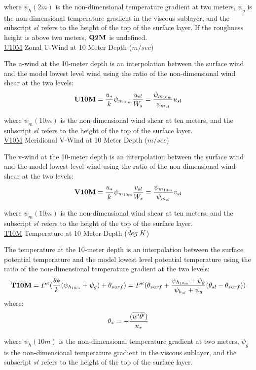\noindent
where $\psi_h(2m)$ is the non-dimensional temperature gradient at two meters, $\psi_g$ is
the non-dimensional temperature gradient in the viscous sublayer, and the subscript
$sl$ refers to the height of the top of the surface layer. If the roughness height
is above two meters, ${\bf Q2M}$ is undefined.
\\
 
\noindent
{ \underline {U10M}  Zonal U-Wind at 10 Meter Depth ($m/sec$) }

\noindent
The u-wind at the 10-meter depth is an interpolation between the surface wind
and the model lowest level wind using the ratio of the non-dimensional wind shear
at the two levels:
\[
{\bf U10M} = {u_* \over k} \psi_{m_{10m}} {u_{sl} \over {W_s}} =
{ \psi_{m_{10m}} \over {\psi_{m_{sl}} }}u_{sl}
\]

\noindent
where $\psi_m(10m)$ is the non-dimensional wind shear at ten meters, and the subscript
$sl$ refers to the height of the top of the surface layer.
\\
 
\noindent
{ \underline {V10M}  Meridional V-Wind at 10 Meter Depth ($m/sec$) }

\noindent
The v-wind at the 10-meter depth is an interpolation between the surface wind
and the model lowest level wind using the ratio of the non-dimensional wind shear
at the two levels:
\[
{\bf V10M} = {u_* \over k} \psi_{m_{10m}} {v_{sl} \over {W_s}} =
{ \psi_{m_{10m}} \over {\psi_{m_{sl}} }}v_{sl}
\]

\noindent
where $\psi_m(10m)$ is the non-dimensional wind shear at ten meters, and the subscript
$sl$ refers to the height of the top of the surface layer.
\\
 
\noindent
{ \underline {T10M}  Temperature at 10 Meter Depth ($deg \hspace{.1cm} K$) }

\noindent
The temperature at the 10-meter depth is an interpolation between the surface potential 
temperature and the model lowest level potential temperature using the ratio of the 
non-dimensional temperature gradient at the two levels:
\[
{\bf T10M} = P^{\kappa} ({\theta* \over k} ({\psi_{h_{10m}}+\psi_g}) + \theta_{surf} ) = 
P^{\kappa}(\theta_{surf} + { {\psi_{h_{10m}}+\psi_g} \over {{\psi_{h_{sl}}+\psi_g}} }
(\theta_{sl} - \theta_{surf})) 
\]
where:
\[
\theta_* = - { (\overline{w^{\prime}\theta^{\prime}}) \over {u_*} }
\]

\noindent
where $\psi_h(10m)$ is the non-dimensional temperature gradient at two meters, $\psi_g$ is
the non-dimensional temperature gradient in the viscous sublayer, and the subscript
$sl$ refers to the height of the top of the surface layer.
\\
 
